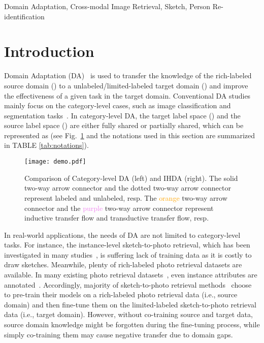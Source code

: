 \documentclass[journal]{IEEEtran}
\begin{document}
\begin{IEEEkeywords}
Domain Adaptation, Cross-modal Image Retrieval, Sketch, Person Re-identification
\end{IEEEkeywords}



\section{Introduction}
\label{sec:intro}
Domain Adaptation (DA)~\cite{pan2010survey} is used to transfer the knowledge of the rich-labeled source domain () to a unlabeled/limited-labeled target domain () and improve the effectiveness of a given task in the target domain. Conventional DA studies mainly focus on the category-level cases, such as image classification and segmentation tasks~\cite{pei2018multi,rozantsev2018beyond,cao2018partial,zou2019consensus,zou2018unsupervised}. In category-level DA, the target label space () and the source label space () are either fully shared or partially shared, which can be represented as  (see Fig.~\ref {fig:demo} and the notations used in this section are summarized in TABLE \ref{tab:notations}). 

\begin{figure}[t]
\centering
  \texttt{[image: demo.pdf]}
  \caption{Comparison of Category-level DA (left) and IHDA (right). The solid two-way arrow connector and the dotted two-way arrow connector represent labeled and unlabeled, resp. The \textcolor{orange}{orange} two-way arrow connector and the \textcolor{violet}{purple} two-way arrow connector represent inductive transfer flow and transductive transfer flow, resp. }
  \label{fig:demo}
\end{figure}


In real-world applications, the needs of DA are not limited to category-level tasks. For instance, the instance-level sketch-to-photo retrieval, which has been investigated in many studies~\cite{pang2018cross,ouyang2016forgetmenot,wang2015sketch,yu2016sketch,zhang2016sketch,bhattacharjee2018query,choi2019sketchhelper,wang2020beyond}, is suffering lack of training data as it is costly to draw sketches. Meanwhile, plenty of rich-labeled photo retrieval datasets are available. In many existing photo retrieval datasets~\cite{semjitter,liu2015faceattributes,zheng2015scalable,wang2019incremental,zeng2020illumination}, even instance attributes are annotated~\cite{wang2015multi,wang2018incremental}. Accordingly, majority of sketch-to-photo retrieval methods~\cite{yu2016sketch,song2016deep,song2017deep,pang2018cross,wu2018light,wu2018coupled,deng2019residual} choose to pre-train their models on a rich-labeled photo retrieval data (i.e., source domain) and then fine-tune them on the limited-labeled sketch-to-photo retrieval data (i.e., target domain). However, without co-training source and target data, source domain knowledge might be forgotten during the fine-tuning process, while simply co-training them may cause negative transfer due to domain gaps.
\end{document}

